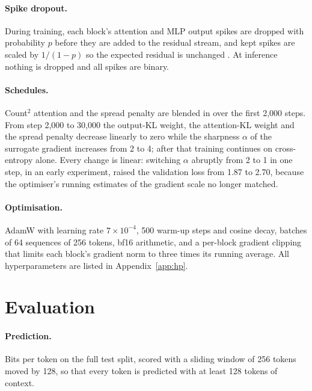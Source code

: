 \paragraph{Spike dropout.} During training, each block's attention and MLP output spikes are dropped with
probability $p$ before they are added to the residual stream, and kept spikes are scaled by $1/(1-p)$ so the
expected residual is unchanged \citep{srivastava2014dropout}. At inference nothing is dropped and all spikes are
binary.

\paragraph{Schedules.} Count$^2$ attention and the spread penalty are blended in over the first 2{,}000 steps. From
step 2{,}000 to 30{,}000 the output-KL weight, the attention-KL weight and the spread penalty decrease linearly to
zero while the sharpness $\alpha$ of the surrogate gradient increases from 2 to 4; after that training continues on
cross-entropy alone. Every change is linear: switching $\alpha$ abruptly from 2 to 1 in one step, in an early
experiment, raised the validation loss from 1.87 to 2.70, because the optimiser's running estimates of the gradient
scale no longer matched.

\paragraph{Optimisation.} AdamW \citep{loshchilov2019adamw} with learning rate $7 \times 10^{-4}$, 500 warm-up steps
and cosine decay, batches of 64 sequences of 256 tokens, bf16 arithmetic, and a per-block gradient clipping that
limits each block's gradient norm to three times its running average. All hyperparameters are listed in
Appendix~\ref{app:hp}.

\section{Evaluation}
\label{sec:eval}

\paragraph{Prediction.} Bits per token on the full test split, scored with a sliding window of 256 tokens moved by
128, so that every token is predicted with at least 128 tokens of context.

